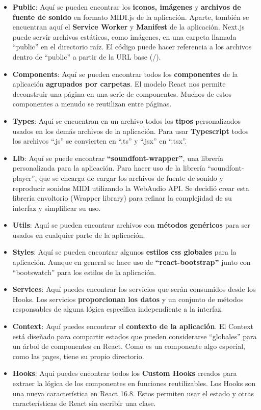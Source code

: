 \documentclass[12pt,twoside,titlepage]{report}
\begin{document}
\begin{itemize}
    \item \textbf{Public}: Aquí se pueden encontrar los \textbf{iconos, imágenes} y \textbf{archivos de fuente de sonido} en formato MIDI.js de la aplicación. Aparte, también se encuentran aquí el \textbf{Service Worker} y \textbf{Manifest} de la aplicación. Next.js puede servir archivos estáticos, como imágenes, en una carpeta llamada ``public'' en el directorio raíz. El código puede hacer referencia a los archivos dentro de ``public'' a partir de la URL base (/).
    \item \textbf{Components}: Aquí se pueden encontrar todos los \textbf{componentes} de la aplicación \textbf{agrupados por carpetas}. El modelo React nos permite deconstruir una página en una serie de componentes. Muchos de estos componentes a menudo se reutilizan entre páginas.
    \item \textbf{Types}: Aquí se encuentran en un archivo todos los \textbf{tipos} personalizados usados en los demás archivos de la aplicación. Para usar \textbf{Typescript} todos los archivos ``.js'' se convierten en ``.ts'' y ``.jsx'' en ``.tsx''.
    \item \textbf{Lib}: Aquí se puede encontrar \textbf{``soundfont-wrapper''}, una librería personalizada para la aplicación. Para hacer uso de la librería ``soundfont-player'', que se encarga de cargar los archivos de fuente de sonido y reproducir sonidos MIDI utilizando la WebAudio API. Se decidió crear esta librería envoltorio (Wrapper library) para refinar la complejidad de su interfaz y simplificar su uso.
    \item \textbf{Utils}: Aquí se pueden encontrar archivos con \textbf{métodos genéricos} para ser usados en cualquier parte de la aplicación.
    \item \textbf{Styles}: Aquí se pueden encontrar algunos \textbf{estilos css globales} para la aplicación. Aunque en general se hace uso de \textbf{``react-bootstrap''} junto con ``bootswatch'' para los estilos de la aplicación.
    \item \textbf{Services}: Aquí puedes encontrar los servicios que serán consumidos desde los Hooks. Los servicios \textbf{proporcionan los datos} y un conjunto de métodos responsables de alguna lógica específica independiente a la interfaz.
    \item \textbf{Context}: Aquí puedes encontrar el \textbf{contexto de la aplicación}. El Context está diseñado para compartir estados que pueden considerarse “globales” para un árbol de componentes en React. Como es un componente algo especial, como las pages, tiene su propio directorio.
    \item \textbf{Hooks}: Aquí puedes encontrar todos los \textbf{Custom Hooks} creados para extraer la lógica de los componentes en funciones reutilizables. Los Hooks son una nueva característica en React 16.8. Estos permiten usar el estado y otras características de React sin escribir una clase.
\end{itemize}
\end{document}
